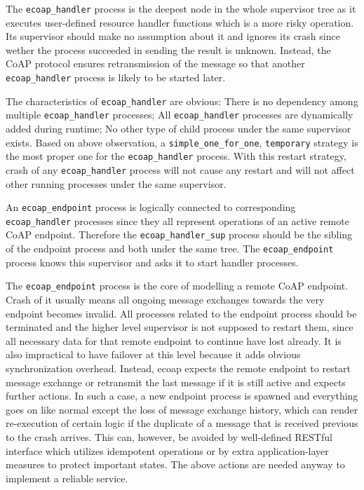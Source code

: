 The \verb|ecoap_handler| process is the deepest node in the whole supervisor tree as it executes user-defined resource handler functions which is a more risky operation. Its supervisor should make no assumption about it and ignores its crash since wether the process succeeded in sending the result is unknown. Instead, the CoAP protocol ensures retransmission of the message so that another \verb|ecoap_handler| process is likely to be started later. 

The characteristics of \verb|ecoap_handler| are obvious: There is no dependency among multiple \verb|ecoap_handler| processes; All \verb|ecoap_handler| processes are dynamically added during runtime; No other type of child process under the same supervisor exists. Based on above observation, a \verb|simple_one_for_one|, \verb|temporary| strategy is the most proper one for the \verb|ecoap_handler| process. With this restart strategy, crash of any \verb|ecoap_handler| process will not cause any restart and will not affect other running processes under the same supervisor.

An \verb|ecoap_endpoint| process is logically connected to corresponding \verb|ecoap_handler| processes since they all represent operations of an active remote CoAP endpoint. Therefore the \verb|ecoap_handler_sup| process should be the sibling of the endpoint process and both under the same tree. The \verb|ecoap_endpoint| process knows this supervisor and asks it to start handler processes.

The \verb|ecoap_endpoint| process is the core of modelling a remote CoAP endpoint. Crash of it usually means all ongoing message exchanges towards the very endpoint becomes invalid. All processes related to the endpoint process should be terminated and the higher level supervisor is not supposed to restart them, since all necessary data for that remote endpoint to continue have lost already. It is also impractical to have failover at this level because it adds obvious synchronization overhead. Instead, ecoap expects the remote endpoint to restart message exchange or retransmit the last message if it is still active and expects further actions. In such a case, a new endpoint process is spawned and everything goes on like normal except the loss of message exchange history, which can render re-execution of certain logic if the duplicate of a message that is received previous to the crash arrives. This can, however, be avoided by well-defined RESTful interface which utilizes idempotent operations or by extra application-layer measures to protect important states. The above actions are needed anyway to implement a reliable service.

